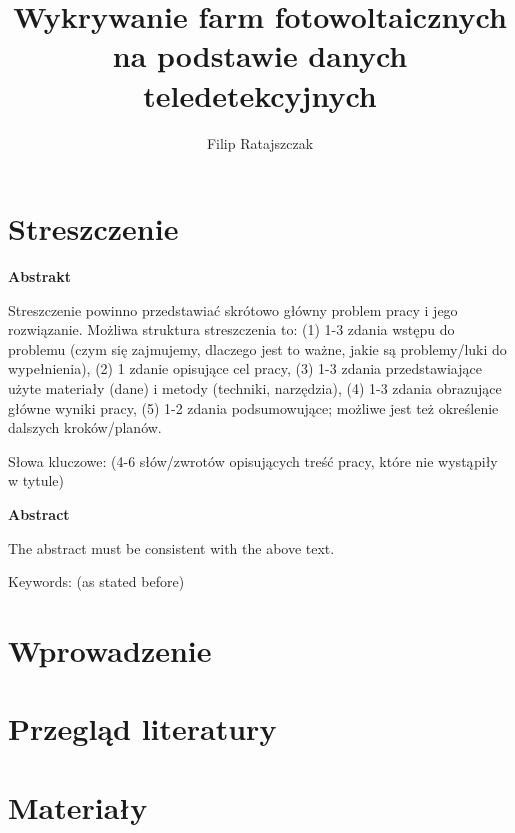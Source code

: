\documentclass{amuthesis}
\author{Filip Ratajszczak}
\title{Wykrywanie farm fotowoltaicznych na podstawie danych
teledetekcyjnych}
\begin{document}

\titlepage


\hypertarget{streszczenie}{%
\chapter*{Streszczenie}\label{streszczenie}}


\textbf{Abstrakt}

Streszczenie powinno przedstawiać skrótowo główny problem pracy i jego
rozwiązanie. Możliwa struktura streszczenia to: (1) 1-3 zdania wstępu do
problemu (czym się zajmujemy, dlaczego jest to ważne, jakie są
problemy/luki do wypełnienia), (2) 1 zdanie opisujące cel pracy, (3) 1-3
zdania przedstawiające użyte materiały (dane) i metody (techniki,
narzędzia), (4) 1-3 zdania obrazujące główne wyniki pracy, (5) 1-2
zdania podsumowujące; możliwe jest też określenie dalszych
kroków/planów.

Słowa kluczowe: (4-6 słów/zwrotów opisujących treść pracy, które nie
wystąpiły w tytule)

\textbf{Abstract}

The abstract must be consistent with the above text.

Keywords: (as stated before)

\newpage

\sf\tighttoc\doublespacing


\hypertarget{sec-wprowadzenie}{%
\chapter{Wprowadzenie}\label{sec-wprowadzenie}}


\hypertarget{sec-lit}{%
\chapter{Przegląd literatury}\label{sec-lit}}


\hypertarget{sec-materialy}{%
\chapter{Materiały}\label{sec-materialy}}
\end{document}

